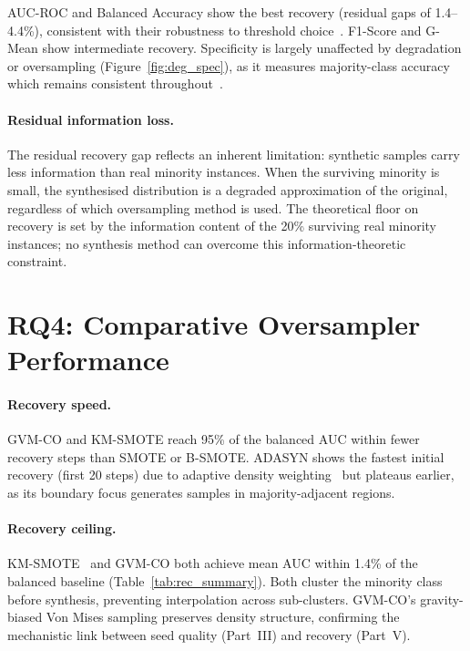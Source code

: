 AUC-ROC and Balanced Accuracy show the best recovery (residual gaps of 1.4--4.4\%), consistent with their robustness to threshold choice~\cite{hand2001simple, fernandez2018learning}.
F1-Score and G-Mean show intermediate recovery.
Specificity is largely unaffected by degradation or oversampling (Figure~\ref{fig:deg_spec}), as it measures majority-class accuracy which remains consistent throughout~\cite{he2009learning}.

\paragraph{Residual information loss.}
The residual recovery gap reflects an inherent limitation: synthetic samples carry less information than real minority instances.
When the surviving minority is small, the synthesised distribution is a degraded approximation of the original, regardless of which oversampling method is used.
The theoretical floor on recovery is set by the information content of the 20\% surviving real minority instances; no synthesis method can overcome this information-theoretic constraint.


\section{RQ4: Comparative Oversampler Performance}
\label{sec:rec:rq4}

\paragraph{Recovery speed.}
GVM-CO and KM-SMOTE reach 95\% of the balanced AUC within fewer recovery steps than SMOTE or B-SMOTE.
ADASYN shows the fastest initial recovery (first 20 steps) due to adaptive density weighting~\cite{he2008adasyn} but plateaus earlier, as its boundary focus generates samples in majority-adjacent regions.

\paragraph{Recovery ceiling.}
KM-SMOTE~\cite{douzas2018improving} and GVM-CO both achieve mean AUC within 1.4\% of the balanced baseline (Table~\ref{tab:rec_summary}).
Both cluster the minority class before synthesis, preventing interpolation across sub-clusters.
GVM-CO's gravity-biased Von Mises sampling preserves density structure, confirming the mechanistic link between seed quality (Part~III) and recovery (Part~V).


